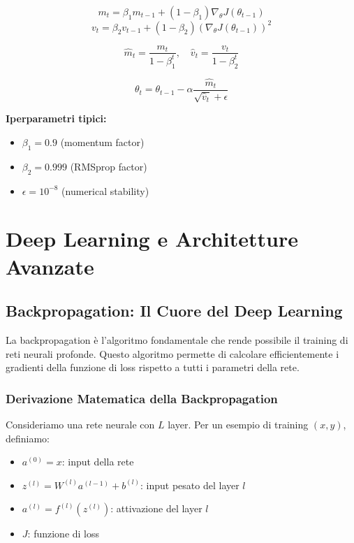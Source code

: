 \documentclass[12pt,a4paper,twoside]{report}
\begin{document}
$$m_t = \beta_1 m_{t-1} + (1 - \beta_1) \nabla_\theta J(\theta_{t-1})$$
$$v_t = \beta_2 v_{t-1} + (1 - \beta_2) (\nabla_\theta J(\theta_{t-1}))^2$$

$$\hat{m}_t = \frac{m_t}{1 - \beta_1^t}, \quad \hat{v}_t = \frac{v_t}{1 - \beta_2^t}$$

$$\theta_t = \theta_{t-1} - \alpha \frac{\hat{m}_t}{\sqrt{\hat{v}_t} + \epsilon}$$

\textbf{Iperparametri tipici:}
\begin{itemize}
    \item $\beta_1 = 0.9$ (momentum factor)
    \item $\beta_2 = 0.999$ (RMSprop factor)
    \item $\epsilon = 10^{-8}$ (numerical stability)
\end{itemize}


\chapter{Deep Learning e Architetture Avanzate}

\section{Backpropagation: Il Cuore del Deep Learning}

La backpropagation è l'algoritmo fondamentale che rende possibile il training di reti neurali profonde. Questo algoritmo permette di calcolare efficientemente i gradienti della funzione di loss rispetto a tutti i parametri della rete.

\subsection{Derivazione Matematica della Backpropagation}

Consideriamo una rete neurale con $L$ layer. Per un esempio di training $(x, y)$, definiamo:

\begin{itemize}
    \item $a^{(0)} = x$: input della rete
    \item $z^{(l)} = W^{(l)} a^{(l-1)} + b^{(l)}$: input pesato del layer $l$
    \item $a^{(l)} = f^{(l)}(z^{(l)})$: attivazione del layer $l$
    \item $J$: funzione di loss
\end{itemize}
\end{document}
